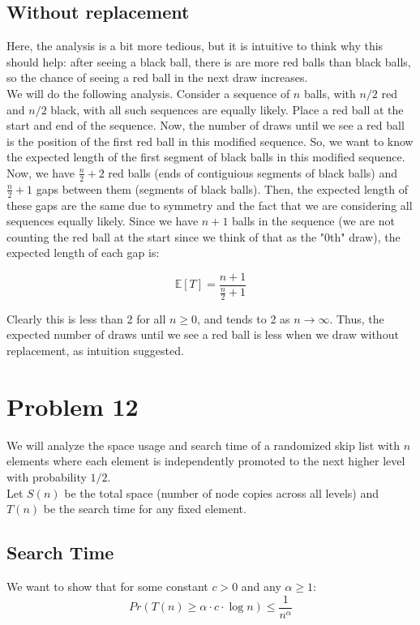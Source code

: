 \documentclass[a4paper]{article}
\begin{document}
\subsection*{Without replacement}
Here, the analysis is a bit more tedious, but it is intuitive to think why this should help: after seeing a black ball, there is are more red balls than black balls, so the chance of seeing a red ball in the next draw increases.\\

\noindent We will do the following analysis. Consider a sequence of $n$ balls, with $n/2$ red and $n/2$ black, with all such sequences are equally likely. Place a red ball at the start and end of the sequence. Now, the number of draws until we see a red ball is the position of the first red ball in this modified sequence. So, we want to know the expected length of the first segment of black balls in this modified sequence. \\

\noindent Now, we have $\frac{n}{2} + 2$ red balls (ends of contiguious segments of black balls) and $\frac{n}{2} + 1$ gaps between them (segments of black balls). Then, the expected length of these gaps are the same due to symmetry and the fact that we are considering all sequences equally likely. Since we have $n + 1$ balls in the sequence (we are not counting the red ball at the start since we think of that as the "0th" draw), the expected length of each gap is:

\[\mathbb{E}[T] = \frac{n + 1}{\frac{n}{2} + 1}\]

\noindent Clearly this is less than 2 for all $n \geq 0$, and tends to 2 as $n \to \infty$. Thus, the expected number of draws until we see a red ball is less when we draw without replacement, as intuition suggested. \\


\newpage
\section*{Problem 12}
We will analyze the space usage and search time of a randomized skip list with $n$ elements where each element is independently promoted to the next higher level with probability $1/2$.\\

\noindent Let $S(n)$ be the total space (number of node copies across all levels) and $T(n)$ be the search time for any fixed element.

\subsection*{Search Time}
We want to show that for some constant $c > 0$ and any $\alpha \geq 1$:
\[Pr(T(n) \geq \alpha \cdot c \cdot \log n) \leq \frac{1}{n^\alpha}\]
\end{document}
